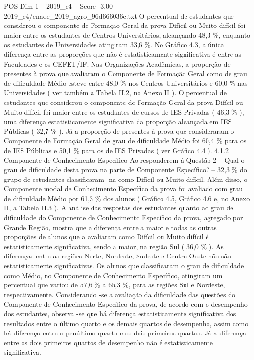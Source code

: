 \begin{textsample}{POS Dim 1 – 2019\_c4 – Score -3.00 – 2019\_c4/enade\_2019\_agro\_96d666036e.txt}
O percentual de estudantes que considerou o componente de Formação Geral da prova Difícil ou Muito difícil foi maior entre os estudantes de Centros Universitários, alcançando 48,3 \%, enquanto os estudantes de Universidades atingiram 33,6 \%.
No Gráfico 4.3, a única diferença entre as proporções que não é estatisticamente significativa é entre as Faculdades e os CEFET/IF.
Nas Organizações Acadêmicas, a proporção de presentes à prova que avaliaram o Componente de Formação Geral como de grau de dificuldade Médio esteve entre 48,0 \% nos Centros Universitários e 60,0 \% nas Universidades ( ver também a Tabela II.2, no Anexo II ).
O percentual de estudantes que considerou o componente de Formação Geral da prova Difícil ou Muito difícil foi maior entre os estudantes de cursos de IES Privadas ( 46,3 \% ), uma diferença estatisticamente significativa da proporção alcançada em IES Públicas ( 32,7 \% ).
Já a proporção de presentes à prova que consideraram o Componente de Formação Geral de grau de dificuldade Médio foi 60,4 \% para os de IES Públicas e 50,1 \% para os de IES Privadas ( ver Gráfico 4.4 ). 4.1.2 Componente de Conhecimento Específico Ao responderem à Questão 2 – Qual o grau de dificuldade desta prova na parte de Componente Específico? – 32,3 \% do grupo de estudantes classificaram -na como Difícil ou Muito difícil.
Além disso, o Componente modal de Conhecimento Específico da prova foi avaliado com grau de dificuldade Médio por 61,3 \% dos alunos ( Gráfico 4.5, Gráfico 4.6 e, no Anexo II, a Tabela II.3 ).
A análise das respostas dos estudantes quanto ao grau de dificuldade do Componente de Conhecimento Específico da prova, agregado por Grande Região, mostra que a diferença entre a maior e todas as outras proporções de alunos que a avaliaram como Difícil ou Muito difícil é estatisticamente significativa, sendo a maior, na região Sul ( 36,0 \% ).
As diferenças entre as regiões Norte, Nordeste, Sudeste e Centro-Oeste não são estatisticamente significativas.
Os alunos que classificaram o grau de dificuldade como Médio, no Componente de Conhecimento Específico, atingiram um percentual que variou de 57,6 \% a 65,3 \%, para as regiões Sul e Nordeste, respectivamente.
Considerando -se a avaliação da dificuldade das questões do Componente de Conhecimento Específico da prova, de acordo com o desempenho dos estudantes, observa -se que há diferença estatisticamente significativa dos resultados entre o último quarto e os demais quartos de desempenho, assim como há diferença entre o penúltimo quarto e os dois primeiros quartos.
Já a diferença entre os dois primeiros quartos de desempenho não é estatisticamente significativa.

\end{textsample}
